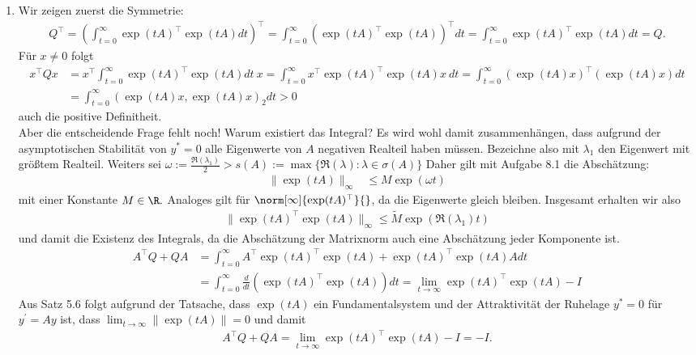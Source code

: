 \begin{solution}
\begin{enumerate}[label = \textbf{\alph*)}]
  \item Wir zeigen zuerst die Symmetrie:
  \begin{align*}
    Q^{\top} = \left(\int_{t = 0}^{\infty} \exp(tA)^{\top}\exp(tA) dt\right)^{\top}
    = \int_{t = 0}^{\infty} \left(\exp(tA)^{\top}\exp(tA)\right)^{\top} dt
    = \int_{t = 0}^{\infty} \exp(tA)^{\top}\exp(tA) dt = Q.
  \end{align*}
  Für $x \neq 0$ folgt
  \begin{align*}
    x^{\top}Qx &= x^{\top}\int_{t = 0}^{\infty} \exp(tA)^{\top}\exp(tA) dt~x
    = \int_{t = 0}^{\infty} x^{\top}\exp(tA)^{\top}\exp(tA) x~ dt
    = \int_{t = 0}^{\infty} (\exp(tA)x)^{\top}(\exp(tA)x) dt \\
    &= \int_{t = 0}^{\infty} (\exp(tA)x,\exp(tA)x)_2 dt > 0
  \end{align*}
  auch die positive Definitheit. \\
  Aber die entscheidende Frage fehlt noch! Warum existiert das Integral?
  Es wird wohl damit zusammenhängen, dass aufgrund der asymptotischen Stabilität
  von $y^* = 0$ alle Eigenwerte von $A$ negativen Realteil haben müssen.
  Bezeichne also mit $\lambda_1$ den Eigenwert mit größtem Realteil.
  Weiters sei $\omega := \frac{\Re(\lambda_1)}{2} > s(A) := \max \{\Re(\lambda): \lambda \in \sigma(A)\}$
  Daher gilt mit Aufgabe 8.1 die Abschätzung:
  \begin{align*}
    \|\exp(tA)\|_{\infty} &\leq  M\exp(\omega t)
  \end{align*}
  mit einer Konstante $M \in \R.$
  Analoges gilt für $\norm[\infty]{\exp(tA)^{\top}}{}$, da die Eigenwerte gleich bleiben. Insgesamt erhalten wir also
  \begin{align*}
    \|\exp(tA)^{\top}\exp(tA)\|_{\infty} \leq \widetilde{M}\exp(\Re(\lambda_1) t)
  \end{align*}
  und damit die Existenz des Integrals, da die Abschätzung der Matrixnorm auch
  eine Abschätzung jeder Komponente ist.
  \begin{align*}
    A^{\top}Q + QA &= \int_{t = 0}^{\infty} A^{\top}\exp(tA)^{\top}\exp(tA) + \exp(tA)^{\top}\exp(tA)Adt \\
    &= \int_{t = 0}^{\infty} \frac{d}{dt}(\exp(tA)^{\top}\exp(tA)) dt
    = \lim_{t \to \infty} \exp(tA)^{\top}\exp(tA) - I
  \end{align*}
  Aus Satz 5.6 folgt aufgrund der Tatsache, dass $\exp(tA)$ ein Fundamentalsystem
  und der Attraktivität der Ruhelage $y^* = 0$ für $y^{\prime} = Ay$
  ist, dass $\lim_{t \to \infty}\|\exp(tA)\| = 0$ und damit
  \begin{align*}
    A^{\top}Q + QA = \lim_{t \to \infty} \exp(tA)^{\top}\exp(tA) - I = -I.
  \end{align*}


\end{enumerate}
\end{solution}
